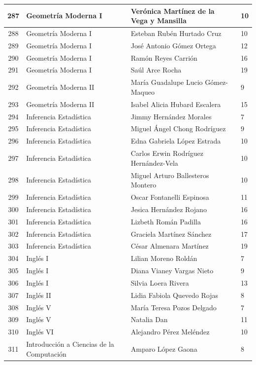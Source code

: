 {\begin{longtable}{|c|p{6.5cm}|p{5cm}|p{1.5cm}|}
287 & Geometría Moderna I & Verónica Martínez de la Vega y Mansilla & 10 \\ \hline
288 & Geometría Moderna I & Esteban Rubén Hurtado Cruz & 10 \\ \hline
289 & Geometría Moderna I & José Antonio Gómez Ortega & 12 \\ \hline
290 & Geometría Moderna I & Ramón Reyes Carrión & 16 \\ \hline
291 & Geometría Moderna I & Saúl Arce Rocha & 19 \\ \hline
292 & Geometría Moderna II & María Guadalupe Lucio Gómez-Maqueo & 9 \\ \hline
293 & Geometría Moderna II & Isabel Alicia Hubard Escalera & 15 \\ \hline
294 & Inferencia Estadística & Jimmy Hernández Morales & 7 \\ \hline
295 & Inferencia Estadística & Miguel Ángel Chong Rodríguez & 9 \\ \hline
296 & Inferencia Estadística & Edna Gabriela López Estrada & 10 \\ \hline
297 & Inferencia Estadística & Carlos Erwin Rodríguez Hernández-Vela & 10 \\ \hline
298 & Inferencia Estadística & Miguel Arturo Ballesteros Montero & 10 \\ \hline
299 & Inferencia Estadística & Oscar Fontanelli Espinosa & 11 \\ \hline
300 & Inferencia Estadística & Jesica Hernández Rojano & 16 \\ \hline
301 & Inferencia Estadística & Lizbeth Román Padilla & 16 \\ \hline
302 & Inferencia Estadística & Graciela Martínez Sánchez & 17 \\ \hline
303 & Inferencia Estadística & César Almenara Martínez & 19 \\ \hline
304 & Inglés I & Lilian Moreno Roldán & 7 \\ \hline
305 & Inglés I & Diana Vianey Vargas Nieto & 9 \\ \hline
306 & Inglés I & Silvia Loera Rivera & 13 \\ \hline
307 & Inglés II & Lidia Fabiola Quevedo Rojas & 8 \\ \hline
308 & Inglés V & María Teresa Pozos Delgado & 7 \\ \hline
309 & Inglés V & Natalia Dan & 11 \\ \hline
310 & Inglés VI & Alejandro Pérez Meléndez & 10 \\ \hline
311 & Introducción a Ciencias de la Computación & Amparo López Gaona & 8 \\ \hline

\end{longtable}}
